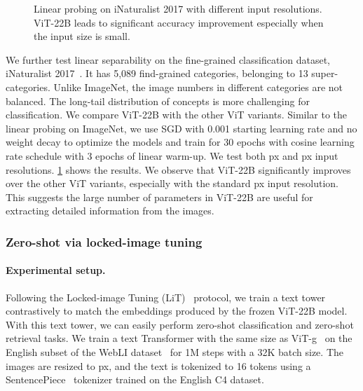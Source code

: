 \documentclass{article}
\newcommand{\chonk}{\mbox{ViT-22B}\xspace}
\begin{document}
\begin{figure}[tbp]
    \centering
{}
    \hspace{15pt} 
\caption{Linear probing on iNaturalist 2017 with different input resolutions. \chonk leads to significant accuracy improvement especially when the input size is small.}
    \label{fig:inat}
\end{figure}



We further test linear separability on the fine-grained classification dataset, iNaturalist 2017~\citep{cui2018large}. It has 5,089 find-grained categories, belonging to 13 super-categories. Unlike ImageNet, the image numbers in different categories are not balanced. The long-tail distribution of concepts is more challenging for classification. We compare \chonk with the other ViT variants. 
Similar to the linear probing on ImageNet, we use SGD with 0.001 starting learning rate and no weight decay to optimize the models and train for 30 epochs with cosine learning rate schedule with 3 epochs of linear warm-up. We test both px and px input resolutions. \cref{fig:inat} shows the results. We observe that \chonk significantly improves over the other ViT variants, especially with the standard px input resolution. This suggests the large number of parameters in \chonk are useful for extracting detailed information from the images. 

\subsubsection{Zero-shot via locked-image tuning}
\label{sect::lit}
\paragraph{Experimental setup.}
Following the Locked-image Tuning (LiT)~\citep{lit} protocol, we train a text tower contrastively to match the embeddings produced by the frozen \chonk model.
With this text tower, we can easily perform zero-shot classification and zero-shot retrieval tasks.
We train a text Transformer with the same size as ViT-g~\citep{zhai2022scaling} on the English subset of the WebLI dataset~\citep{chen2022pali} for 1M steps with a 32K batch size.
The images are resized to px, and the text is tokenized to 16 tokens using a SentencePiece~\citep{kudo-richardson-2018-sentencepiece} tokenizer trained on the English C4 dataset.
\end{document}
